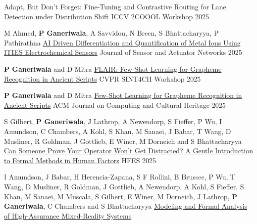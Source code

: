 \begin{cventries}
{{Adapt, But Don’t Forget: Fine-Tuning and Contrastive Routing for Lane Detection under Distribution Shift}}
{}
{ICCV 2COOOL Workshop 2025} 
{ %
\begin{cvitems}
\end{cvitems}
}
\cventry
{M Ahmed, \textbf{P Ganeriwala}, A Savvidou, N
Breen, S Bhattacharyya, P Pathirathna}
{
\href{https://www.mdpi.com/2224-2708/14/4/70}{AI Driven Differentiation and Quantification of Metal Ions Using ITIES Electrochemical Sensors}}
{}
{Journal of Sensor and Actuator Networks 2025} 
{ %
\begin{cvitems}
\end{cvitems}
}
\cventry
{\textbf{P Ganeriwala} and D Mitra}
{	
\href{https://sint4ch.fbk.eu/program}{FLAIR: Few-Shot Learning for Grapheme Recognition in Ancient Scripts}}
{}
{CVPR SINT4CH Workshop 2025} 
{ %
\begin{cvitems}
\end{cvitems}
}
\cventry
{\textbf{P Ganeriwala} and D Mitra}
{\href{https://dl.acm.org/doi/10.1145/3773290}{%
Few-Shot Learning for Grapheme Recognition in Ancient Scripts}}
{}
{ACM Journal on Computing and Cultural Heritage 2025} 
{ %
\begin{cvitems}
\end{cvitems}
}
\cventry
{S Gilbert, \textbf{P Ganeriwala}, J Lathrop, A Newendorp, S Fieffer, P Wu, I Amundson, C Chambers, A Kohl,  S Khan, M Sanaei, J Babar, T Wang, D Musliner, R Goldman, J Gottlieb, E Winer, M Dorneich and S Bhattacharyya}
{\href{https://journals.sagepub.com/doi/full/10.1177/10711813251369496}{Can Someone Prove Your Operator Won’t Get Distracted? A Gentle Introduction to Formal Methods in Human Factors}}
{}
{HFES 2025} 
{ %
\begin{cvitems}
\end{cvitems}
}
\cventry
{I Amundson, J Babar, H Herencia-Zapana, S F Rollini, B Brussee, P Wu, T Wang, D Musliner, R Goldman, J Gottlieb, A Newendorp, A Kohl, S Fieffer, S Khan, M Sanaei, M Muscala, S Gilbert, E Winer, M Dorneich, J Lathrop, \textbf{P Ganeriwala}, C Chambers and S Bhattacharyya}
{\href{https://ieeexplore.ieee.org/document/11257175}{Modeling and Formal Analysis of High-Assurance Mixed-Reality Systems}}

\end{cventries}
